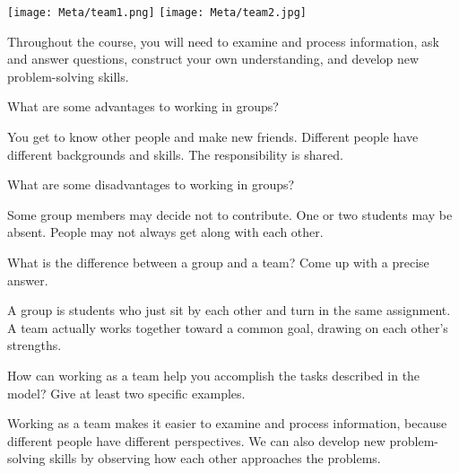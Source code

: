 

\begin{center}
\texttt{[image: Meta/team1.png]}
\hspace{0.5in}
\texttt{[image: Meta/team2.jpg]}
\end{center}

Throughout the course, you will need to examine and process information, ask and answer questions, construct your own understanding, and develop new problem-solving skills.



\Q What are some advantages to working in groups?

\begin{answer}[5em]
You get to know other people and make new friends.
Different people have different backgrounds and skills.
The responsibility is shared.
\end{answer}


\Q What are some disadvantages to working in groups?

\begin{answer}[5em]
Some group members may decide not to contribute.
One or two students may be absent.
People may not always get along with each other.
\end{answer}


\Q What is the difference between a group and a team? Come up with a precise answer.

\begin{answer}[5em]
A group is students who just sit by each other and turn in the same assignment.
A team actually works together toward a common goal, drawing on each other's strengths.
\end{answer}


\Q How can working as a team help you accomplish the tasks described in the model?
Give at least two specific examples.

\begin{answer}[5em]
Working as a team makes it easier to examine and process information, because different people have different perspectives.
We can also develop new problem-solving skills by observing how each other approaches the problems.
\end{answer}
